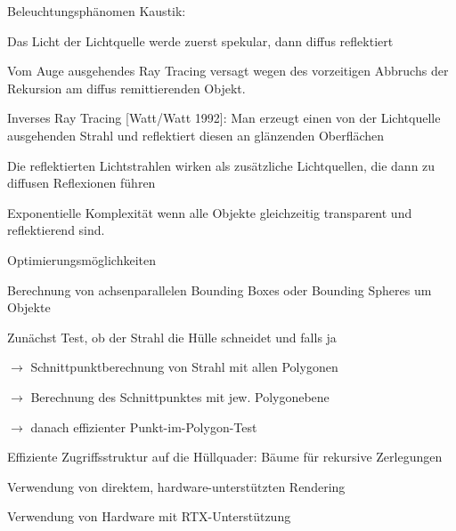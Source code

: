 \documentclass[landscape]{article}
\begin{document}
\begin{multicols}{3}
  Beleuchtungsphänomen Kaustik:
  \begin{itemize*}
    \item Das Licht der Lichtquelle werde zuerst spekular, dann diffus reflektiert
    \item Vom Auge ausgehendes Ray Tracing versagt wegen des vorzeitigen Abbruchs der Rekursion am diffus remittierenden Objekt.
    \item Inverses Ray Tracing [Watt/Watt 1992]: Man erzeugt einen von der Lichtquelle ausgehenden Strahl und reflektiert diesen an glänzenden Oberflächen
    \item Die reflektierten Lichtstrahlen wirken als zusätzliche Lichtquellen, die dann zu diffusen Reflexionen führen
    \item Exponentielle Komplexität wenn alle Objekte gleichzeitig transparent und reflektierend sind.
  \end{itemize*}
  
  Optimierungsmöglichkeiten
  \begin{itemize*}
    \item Berechnung von achsenparallelen Bounding Boxes oder Bounding Spheres um Objekte
    \item Zunächst Test, ob der Strahl die Hülle schneidet und falls ja
    \item $\rightarrow$ Schnittpunktberechnung von Strahl mit allen Polygonen
    \item $\rightarrow$ Berechnung des Schnittpunktes mit jew. Polygonebene
    \item $\rightarrow$ danach effizienter Punkt-im-Polygon-Test
    \item Effiziente Zugriffsstruktur auf die Hüllquader: Bäume für rekursive Zerlegungen
    \item Verwendung von direktem, hardware-unterstützten Rendering
    \item Verwendung von Hardware mit RTX-Unterstützung
  \end{itemize*}
  

\end{multicols}
\end{document}
